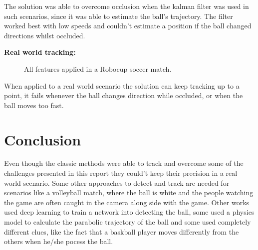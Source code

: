 \documentclass[10pt,twocolumn,letterpaper]{article}
\begin{document}
  The solution was able to overcome occlusion when the kalman filter was used in
  such scenarios, since it was able to estimate the ball's trajectory. The
  filter worked best with low speeds and couldn't estimate a position if the
  ball changed directions whilst occluded.

  \bigbreak
  \textbf{Real world tracking:}
  \bigbreak

  \begin{figure}[!h]
    \centering
    \setlength{\fboxsep}{1pt}
    \setlength{\fboxrule}{1pt}
    \caption{All features applied in a Robocup soccer match.}
    \label{fig:robocup_1}
  \end{figure}

  When applied to a real world scenario the solution can keep tracking up to a
  point, it fails whenever the ball changes direction while occluded, or when
  the ball moves too fast.

\section{Conclusion}

  Even though the classic methods were able to track and overcome some of the
  challenges presented in this report they could't keep their precision in a real world
  scenario. Some other approaches to detect and track are needed for scenarios
  like a volleyball match, where the ball is white and the people watching the
  game are often caught in the camera along side with the game. Other works used deep
  learning to train a network into detecting the ball, some used a physics model
  to calculate the parabolic trajectory of the ball and some used completely
  different clues, like the fact that a baskball player moves differently from
  the others when he/she pocess the ball.
\end{document}
